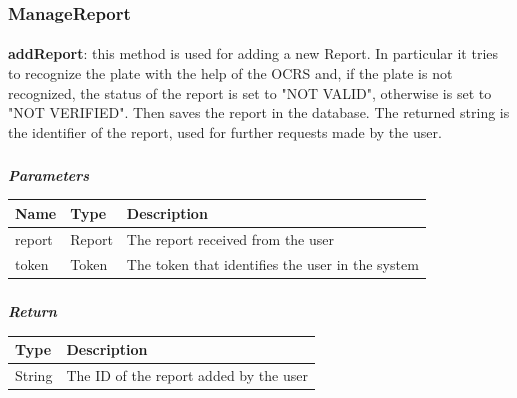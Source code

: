 				\subsubsection{ManageReport}
					\paragraph{}
							\textbf{addReport}: this method is used for adding a new Report. In particular it tries to recognize the  plate with the help of the OCRS and, if the plate is not recognized, the status of the report is set to "NOT VALID", otherwise is set to "NOT VERIFIED". Then saves the report in the database. The returned string is the identifier of the report, used for further requests made by the user. 
							\subparagraph{}
							\vspace{-3mm}
							\textcolor{myBlue}{\textit{\textbf{Parameters}}}
							\vspace{-2mm}
								\begin{table}[!h]
									\begin{tabular}{L{0.15\textwidth}L{0.15\textwidth}L{0.58\textwidth}}
										\toprule
										\textbf{Name} & \textbf{Type} & \textbf{Description} \\
										\midrule
								  		report & Report & The report received from the user \\
								  		token & Token & The token that identifies the user in the system \\
								 		\bottomrule
									\end{tabular}
								\end{table}
							\subparagraph{}
							\vspace{-6mm}
								\textcolor{myGreen}{\textit{\textbf{Return}}}
								\vspace{-2mm}
									\begin{table}[!h]
									\begin{tabular}{L{0.15\textwidth}L{0.77\textwidth}}
										\toprule
										\textbf{Type} & \textbf{Description} \\
										\midrule
								  		String & The ID of the report added by the user \\
								 		\bottomrule
									\end{tabular}
								\end{table}
					\clearpage
